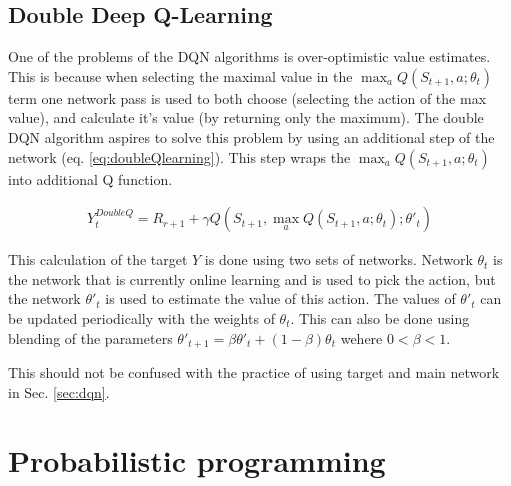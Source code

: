 \subsection{Double Deep Q-Learning}

One of the problems of the DQN algorithms is over-optimistic value estimates.
This is because when selecting the maximal value in the $\max_{a} Q(S_{t+1},a; \theta_{t})$ term one network pass is used to both choose (selecting the action of the max value), and calculate it's value (by returning only the maximum).
The double DQN algorithm \cite{https://doi.org/10.48550/arxiv.1509.06461} aspires to solve this problem by using an additional step of the network (eq. \ref{eq:doubleQlearning}).
This step wraps the $\max_{a} Q(S_{t+1},a; \theta_{t})$ into additional Q function.

\begin{align}
 Y_{t}^{DoubleQ} =  R_{r+1} + \gamma Q(S_{t+1}, \max_{a} Q(S_{t+1},a; \theta_{t}); \theta'_{t})
\label{eq:doubleQlearning}
\end{align}

This calculation of the target $Y$ is done using two sets of networks. Network $\theta_{t}$ is the network that is currently online learning and is used to pick the action, but the network $\theta'_{t}$ is used to estimate the value of this action.
The values of $\theta'_{t}$ can be updated periodically with the weights of $\theta_{t}$.
This can also be done using blending of the parameters $\theta'_{t+1} = \beta \theta'_{t} + (1-\beta)\theta_{t}$ wehere $0<\beta<1$.

This should not be confused with the practice of using target and main network in Sec. \ref{sec:dqn}.
\section{Probabilistic programming}
%
%

